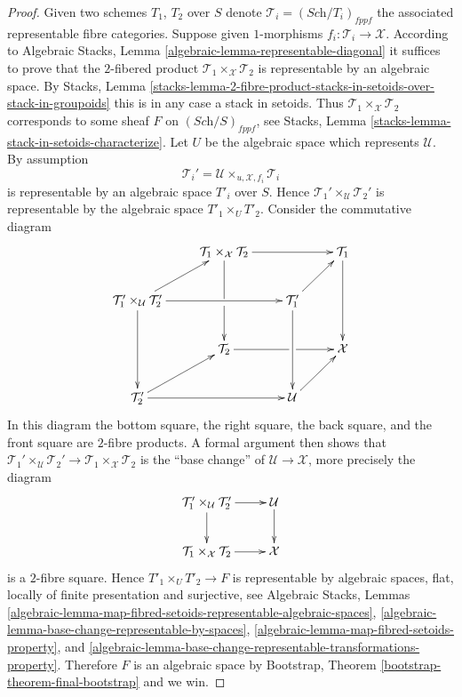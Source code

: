 \begin{proof}
Given two schemes $T_1$, $T_2$ over $S$ denote
$\mathcal{T}_i = (\textit{Sch}/T_i)_{fppf}$ the associated representable
fibre categories. Suppose given $1$-morphisms
$f_i : \mathcal{T}_i \to \mathcal{X}$.
According to
Algebraic Stacks, Lemma \ref{algebraic-lemma-representable-diagonal}
it suffices to prove that the $2$-fibered
product $\mathcal{T}_1 \times_{\mathcal{X}} \mathcal{T}_2$
is representable by an algebraic space. By
Stacks, Lemma
\ref{stacks-lemma-2-fibre-product-stacks-in-setoids-over-stack-in-groupoids}
this is in any case a stack in setoids. Thus
$\mathcal{T}_1 \times_{\mathcal{X}} \mathcal{T}_2$ corresponds
to some sheaf $F$ on $(\textit{Sch}/S)_{fppf}$, see
Stacks, Lemma \ref{stacks-lemma-stack-in-setoids-characterize}.
Let $U$ be the algebraic space which represents $\mathcal{U}$.
By assumption
$$
\mathcal{T}_i' = \mathcal{U} \times_{u, \mathcal{X}, f_i} \mathcal{T}_i
$$
is representable by an algebraic space $T'_i$ over $S$. Hence
$\mathcal{T}_1' \times_\mathcal{U} \mathcal{T}_2'$ is representable
by the algebraic space $T'_1 \times_U T'_2$.
Consider the commutative diagram
$$
\xymatrix{
&
\mathcal{T}_1 \times_{\mathcal X} \mathcal{T}_2 \ar[rr]\ar'[d][dd] & &
\mathcal{T}_1 \ar[dd] \\ 
\mathcal{T}_1' \times_\mathcal{U} \mathcal{T}_2' \ar[ur]\ar[rr]\ar[dd] & &
\mathcal{T}_1' \ar[ur]\ar[dd] \\ 
&
\mathcal{T}_2 \ar'[r][rr] & &
\mathcal X \\ 
\mathcal{T}_2' \ar[rr]\ar[ur] & &
\mathcal{U} \ar[ur] }
$$
In this diagram the bottom square, the right square, the back square, and
the front square are $2$-fibre products. A formal argument then shows
that $\mathcal{T}_1' \times_\mathcal{U} \mathcal{T}_2' \to 
\mathcal{T}_1 \times_{\mathcal X} \mathcal{T}_2$
is the ``base change'' of $\mathcal{U} \to \mathcal{X}$, more precisely
the diagram
$$
\xymatrix{
\mathcal{T}_1' \times_\mathcal{U} \mathcal{T}_2' \ar[d] \ar[r] &
\mathcal{U} \ar[d] \\
\mathcal{T}_1 \times_{\mathcal X} \mathcal{T}_2 \ar[r] &
\mathcal{X}
}
$$
is a $2$-fibre square.
Hence $T'_1 \times_U T'_2 \to F$ is representable by algebraic spaces,
flat, locally of finite presentation and surjective, see
Algebraic Stacks, Lemmas
\ref{algebraic-lemma-map-fibred-setoids-representable-algebraic-spaces},
\ref{algebraic-lemma-base-change-representable-by-spaces},
\ref{algebraic-lemma-map-fibred-setoids-property}, and
\ref{algebraic-lemma-base-change-representable-transformations-property}.
Therefore $F$ is an algebraic space by
Bootstrap, Theorem \ref{bootstrap-theorem-final-bootstrap}
and we win.
\end{proof}








